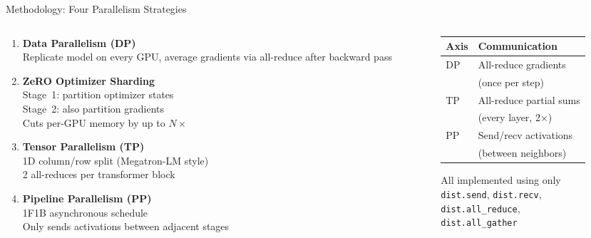 \documentclass[10pt, aspectratio=169]{beamer}
\begin{document}

\begin{frame}{Methodology: Four Parallelism Strategies}
  \begin{columns}[T]
  \begin{column}{0.55\textwidth}
    \begin{enumerate}
      \item \textbf{Data Parallelism (DP)}\\
      Replicate model on every GPU, average gradients via all-reduce after backward pass

      \item \textbf{ZeRO Optimizer Sharding}\\
      Stage~1: partition optimizer states\\
      Stage~2: also partition gradients\\
      Cuts per-GPU memory by up to $N\times$

      \item \textbf{Tensor Parallelism (TP)}\\
      1D column/row split (Megatron-LM style)\\
      2 all-reduces per transformer block

      \item \textbf{Pipeline Parallelism (PP)}\\
      1F1B asynchronous schedule\\
      Only sends activations between adjacent stages
    \end{enumerate}
  \end{column}
  \begin{column}{0.42\textwidth}
    \centering
    \small
    \begin{tabular}{ll}
      \toprule
      \textbf{Axis} & \textbf{Communication} \\
      \midrule
      DP & All-reduce gradients \\
         & (once per step) \\
      \midrule
      TP & All-reduce partial sums \\
         & (every layer, 2$\times$) \\
      \midrule
      PP & Send/recv activations \\
         & (between neighbors) \\
      \bottomrule
    \end{tabular}

    \vspace{0.6em}
    All implemented using only\\
    \texttt{dist.send}, \texttt{dist.recv},\\
    \texttt{dist.all\_reduce},\\
    \texttt{dist.all\_gather}
  \end{column}
  \end{columns}
\end{frame}
\end{document}
